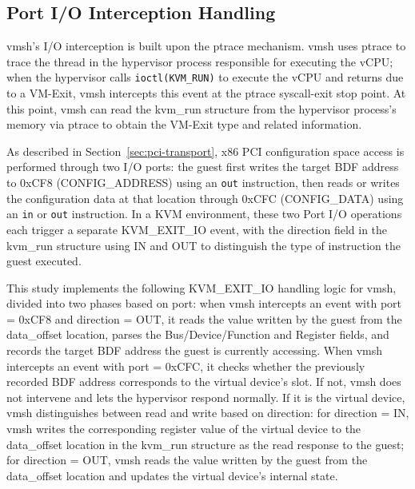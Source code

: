\begin{ZhChapter}
\subsection{Port I/O Interception Handling}
\label{sec:port-io-handling}

\begin{sloppypar}
vmsh's I/O interception is built upon the ptrace mechanism. vmsh uses ptrace to trace the thread in the hypervisor process responsible for executing the vCPU; when the hypervisor calls \texttt{ioctl(KVM\_RUN)} to execute the vCPU and returns due to a VM-Exit, vmsh intercepts this event at the ptrace syscall-exit stop point. At this point, vmsh can read the kvm\_run structure from the hypervisor process's memory via ptrace to obtain the VM-Exit type and related information.
\end{sloppypar}

As described in Section~\ref{sec:pci-transport}, x86 PCI configuration space access is performed through two I/O ports: the guest first writes the target BDF address to 0xCF8 (CONFIG\_ADDRESS) using an \texttt{out} instruction, then reads or writes the configuration data at that location through 0xCFC (CONFIG\_DATA) using an \texttt{in} or \texttt{out} instruction. In a KVM environment, these two Port I/O operations each trigger a separate KVM\_EXIT\_IO event, with the direction field in the kvm\_run structure using IN and OUT to distinguish the type of instruction the guest executed.

\begin{sloppypar}
This study implements the following KVM\_EXIT\_IO handling logic for vmsh, divided into two phases based on port: when vmsh intercepts an event with port = 0xCF8 and direction = OUT, it reads the value written by the guest from the data\_offset location, parses the Bus/Device/Function and Register fields, and records the target BDF address the guest is currently accessing. When vmsh intercepts an event with port = 0xCFC, it checks whether the previously recorded BDF address corresponds to the virtual device's slot. If not, vmsh does not intervene and lets the hypervisor respond normally. If it is the virtual device, vmsh distinguishes between read and write based on direction: for direction = IN, vmsh writes the corresponding register value of the virtual device to the data\_offset location in the kvm\_run structure as the read response to the guest; for direction = OUT, vmsh reads the value written by the guest from the data\_offset location and updates the virtual device's internal state.
\end{sloppypar}


\end{ZhChapter}
